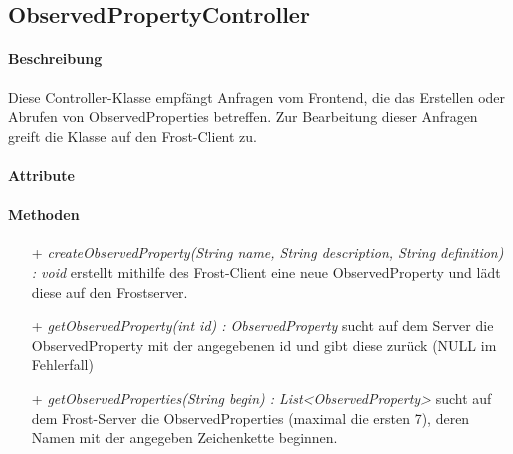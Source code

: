 \subsection{ObservedPropertyController}

\paragraph{Beschreibung}
Diese Controller-Klasse empfängt Anfragen vom Frontend, die das Erstellen oder Abrufen von ObservedProperties betreffen. Zur Bearbeitung dieser Anfragen greift die Klasse auf den Frost-Client zu.


\paragraph{Attribute}

\paragraph{Methoden}
\begin{itemize}
\item[+] \textit{ createObservedProperty(String name, String description, String definition) : void }
erstellt mithilfe des Frost-Client eine neue ObservedProperty und lädt diese auf den Frostserver.
\item[+] \textit{getObservedProperty(int id) : ObservedProperty}
sucht auf dem Server die ObservedProperty mit der angegebenen id und gibt diese zurück (NULL im Fehlerfall)
\item[+] \textit{getObservedProperties(String begin) : List<ObservedProperty> }
sucht auf dem Frost-Server die ObservedProperties (maximal die ersten 7), deren Namen mit der angegeben Zeichenkette beginnen.
\end{itemize}